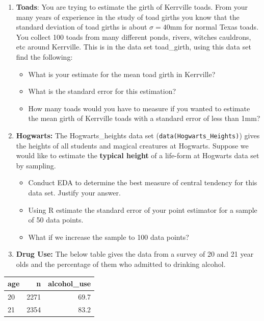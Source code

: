 \documentclass[
]{book}
\providecommand{\tightlist}{%
  \setlength{\itemsep}{0pt}\setlength{\parskip}{0pt}}
\theoremstyle{definition}
\theoremstyle{definition}
\theoremstyle{definition}
\theoremstyle{definition}
\theoremstyle{remark}
\begin{document}
\begin{enumerate}
\def\labelenumi{\arabic{enumi}.}
\tightlist
\item
  \textbf{Toads}: You are trying to estimate the girth of Kerrville toads. From your many years of experience in the study of toad girths you know that the standard deviation of toad girths is about \(\sigma=40\)mm for normal Texas toads. You collect 100 toads from many different ponds, rivers, witches cauldrons, etc around Kerrville. This is in the data set toad\_girth, using this data set find the following:

  \begin{itemize}
  \tightlist
  \item
    What is your estimate for the mean toad girth in Kerrville?
  \item
    What is the standard error for this estimation?
  \item
    How many toads would you have to measure if you wanted to estimate the mean girth of Kerrville toads with a standard error of less than 1mm?
  \end{itemize}
\item
  \textbf{Hogwarts:} The Hogwarts\_heights data set (\texttt{data(Hogwarts\_Heights)}) gives the heights of all students and magical creatures at Hogwarts. Suppose we would like to estimate the \textbf{typical height} of a life-form at Hogwarts data set by sampling.

  \begin{itemize}
  \tightlist
  \item
    Conduct EDA to determine the best measure of central tendency for this data set. Justify your answer.
  \item
    Using R estimate the standard error of your point estimator for a sample of 50 data points.
  \item
    What if we increase the sample to 100 data points?
  \end{itemize}
\item
  \textbf{Drug Use:}
  The below table gives the data from a survey of 20 and 21 year olds and the percentage of them who admitted to drinking alcohol.
\end{enumerate}

\begin{tabular}{l|r|r}
\hline
age & n & alcohol\_use\\
\hline
20 & 2271 & 69.7\\
\hline
21 & 2354 & 83.2\\
\hline
\end{tabular}
\end{document}
